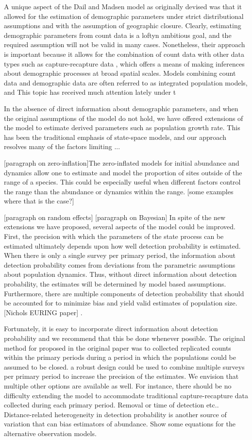 \documentclass[12pt]{article}
\begin{document}
A unique aspect of the Dail and Madsen model as originally devised was
that it allowed for the estimation of demographic parameters under
strict distributional assumptions and with the assumption of
geographic closure. Clearly, estimating demographic parameters from
count data is a loftyn ambitious goal, and the required assumption
will not be valid in many cases. Nonetheless, their approach is
important because it allows for the combination of count data with
other data types such as capture-recapture data , which offers a
means of making inferences about demographic processes at broad
spatial scales. Models combining count data and demographic data are
often referred to as integrated population models, and This topic has
received much attention lately under t

In the absence of direct information about demographic parameters, and
when the original assumptions of the model do not hold, we have
offered extensions of the model to estimate derived parameters such as
population growth rate. This has been the traditional emphasis of
state-space models, and our approach resolves many of the factors
limiting ...

[paragraph on zero-inflation]The zero-inflated models for initial
abundance and dynamics allow one to estimate and model the proportion
of sites outside of the range of a species.  This could be especially
useful when different factors control the range than the abundance or
dynamics within the range.  [some examples where that is the case?]

 [paragraph on random effects]
[paragraph on Bayesian]
In spite of the new extensions we have proposed, several aspects of
the model could be improved. First, the precision with which the
parameters of the state process can be estimated ultimately depends
upon how well detection probability is estimated. When there is only a
single survey per primary period, the information about detection
probability comes from deviations from the parametric assumptions
about population dynamics. Thus, without direct information about
detection probability, the estimates will be determined by model based
assumptions. Furthermore, there are multiple components of detection
probability that should be accounted for to minimize bias and yield
valid estimates of population size. [Nichols EURING paper] .

Fortunately, it is easy to incorporate direct information about
detection probability and we recommend that this be done whenever
possible. The original method for proposed in the original paper was
to collected replicated counts within the primary periods during a
period in which the populations could be assumed to be closed.  a
robust design could be used to combine multiple surveys per primary
period to increase the precision of the estimates. We envision that
multiple other options are available as well. For instance, there
should be no difficulty extending the model to accommodate traditional
capture-recapture data collected during each primary period. Removal
or time of detection etc.. Distance-related heterogeneity in detection
probability is another source of variation that can bias estimators of
abundance.   Show some equations for the alternative observation
models.
\end{document}
